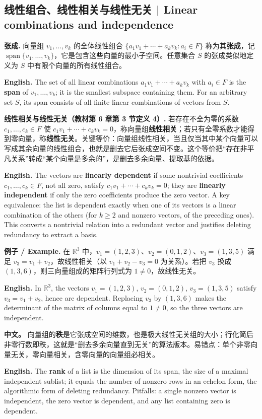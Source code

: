 \documentclass[UTF8,11pt,a4paper]{ctexart}
\newcommand{\EN}[1]{\par\noindent\textbf{English.} #1\par}
\newcommand{\EX}[2]{\par\noindent\textbf{例子 / Example.} #1\par\EN{#2}}
\newcommand{\APS}[2]{\par\noindent\textbf{中文。} #1\par\noindent\textbf{English.} #2\par\smallskip}
\begin{document}
\subsection{线性组合、线性相关与线性无关 | Linear combinations and independence}
\noindent\textbf{张成.} 向量组 $v_1,\dots,v_k$ 的全体线性组合 $\{a_1v_1+\cdots+a_kv_k:a_i\in F\}$ 称为其\textbf{张成}，记 $\operatorname{span}\{v_1,\dots,v_k\}$，它是包含这些向量的最小子空间。任意集合 $S$ 的张成类似地定义为 $S$ 中有限个向量的所有线性组合。
\EN{The set of all linear combinations $a_1v_1+\cdots+a_kv_k$ with $a_i\in F$ is the \textbf{span} of $v_1,\dots,v_k$; it is the smallest subspace containing them. For an arbitrary set $S$, its span consists of all finite linear combinations of vectors from $S$.}
\noindent\textbf{线性相关与线性无关（教材第 6 章第 3 节定义 4）.} 若存在不全为零的系数 $c_1,\dots,c_k\in F$ 使 $c_1v_1+\cdots+c_kv_k=0$，称向量组\textbf{线性相关}；若只有全零系数才能得到零向量，称\textbf{线性无关}。关键等价：向量组线性相关，当且仅当其中某个向量可以写成其余向量的线性组合，也就是删去它后张成空间不变。这个等价把“存在非平凡关系”转成“某个向量是多余的”，是删去多余向量、提取基的依据。
\EN{The vectors are \textbf{linearly dependent} if some nontrivial coefficients $c_1,\dots,c_k\in F$, not all zero, satisfy $c_1v_1+\cdots+c_kv_k=0$; they are \textbf{linearly independent} if only the zero coefficients produce the zero vector. A key equivalence: the list is dependent exactly when one of its vectors is a linear combination of the others (for $k\ge2$ and nonzero vectors, of the preceding ones). This converts a nontrivial relation into a redundant vector and justifies deleting redundancy to extract a basis.}
\EX{在 $\mathbb R^3$ 中，$v_1=(1,2,3)$、$v_2=(0,1,2)$、$v_3=(1,3,5)$ 满足 $v_3=v_1+v_2$，故线性相关（以 $v_1+v_2-v_3=0$ 为关系）。若把 $v_3$ 换成 $(1,3,6)$，则三向量组成的矩阵行列式为 $1\ne0$，故线性无关。}{In $\mathbb R^3$, the vectors $v_1=(1,2,3)$, $v_2=(0,1,2)$, $v_3=(1,3,5)$ satisfy $v_3=v_1+v_2$, hence are dependent. Replacing $v_3$ by $(1,3,6)$ makes the determinant of the matrix of columns equal to $1\ne0$, so the three vectors are independent.}
\APS{向量组的\textbf{秩}是它张成空间的维数，也是极大线性无关组的大小；行化简后非零行数即秩，这就是“删去多余向量直到无关”的算法版本。易错点：单个非零向量无关，零向量相关，含零向量的向量组必相关。}{The \textbf{rank} of a list is the dimension of its span, the size of a maximal independent sublist; it equals the number of nonzero rows in an echelon form, the algorithmic form of deleting redundancy. Pitfalls: a single nonzero vector is independent, the zero vector is dependent, and any list containing zero is dependent.}
\end{document}
